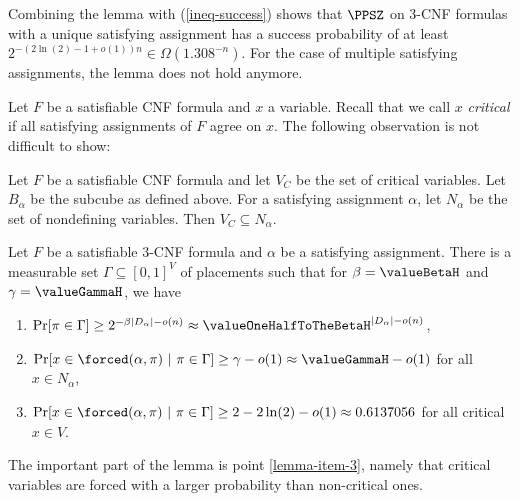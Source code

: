 Combining the lemma with (\ref{ineq-success}) shows that $\PPSZ$ on
$3$-CNF formulas with a unique satisfying assignment has a success
probability of at least $2^{-(2\ln(2)-1+o(1))n} \in
\Omega(1.308^{-n})$. For the case of multiple satisfying assignments,
the lemma does not hold anymore.\paragraphprev

Let $F$ be a satisfiable CNF formula and
$x$ a variable. Recall that we call $x$ {\em critical} if all satisfying assignments
of $F$ agree on $x$. The following observation is not difficult
to show:
\begin{observation}
  Let $F$ be a satisfiable CNF formula and let $V_C$ be the set of
  critical variables. Let $B_\alpha$ be the subcube as defined
  above. For a satisfying assignment $\alpha$, let $N_\alpha$ be the
  set of nondefining variables. 
  Then $V_C \subseteq N_\alpha$.
\end{observation}
\begin{lemma}
  Let $F$ be a satisfiable $3$-CNF formula and $\alpha$ be a
  satisfying assignment. There is a measurable set $\Gamma \subseteq
  [0,1]^V$ of placements such that for $\beta = \valueBetaH$ and
  $\gamma = \valueGammaH$, we have
  \begin{enumerate}
  \item $\Pr[\pi \in \Gamma] \geq 2^{-\beta |D_\alpha|-o(n)} \approx
    \valueOneHalfToTheBetaH^{|D_\alpha|-o(n)}$,
  \item $\Pr[x \in \forced(\alpha,\pi) \ | \ \pi \in \Gamma] \geq
    \gamma - o(1) \approx \valueGammaH - o(1)$ for all $x \in
    N_\alpha$,
  \item $\Pr[x \in \forced(\alpha,\pi) \ | \ \pi \in \Gamma] \geq
    2-2\ln(2) - o(1) \approx 0.6137056$ for all critical $x\in V$.
      \label{lemma-item-3}
    \end{enumerate}
    \label{lemma-forced-critical}
\end{lemma}
The important part of the lemma is point \ref{lemma-item-3}, namely
that critical variables are forced with a larger probability than
non-critical ones.
